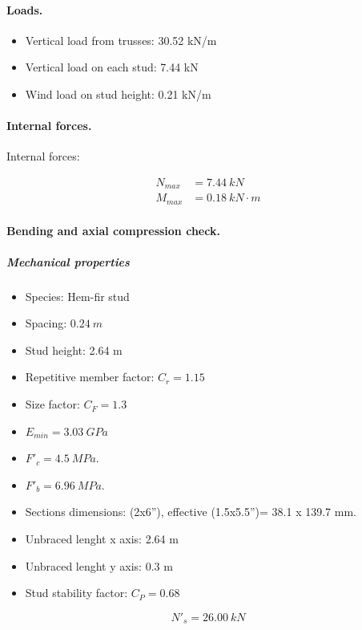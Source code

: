 \paragraph{Loads.}

\begin{itemize}
\item Vertical load from trusses: 30.52 kN/m
\item Vertical load on each stud: 7.44 kN
\item Wind load on stud height: 0.21 kN/m
\end{itemize}

\paragraph{Internal forces.}

\noindent Internal forces:

\begin{align}
  N_{max}&= 7.44\ kN \\
  M_{max}&= 0.18\ kN \cdot m
\end{align}

\paragraph{Bending and axial compression check.}

\subparagraph{Mechanical properties}

\begin{itemize}
\item Species: Hem-fir stud
\item Spacing: $0.24\ m$
\item Stud height: 2.64 m
\item Repetitive member factor: $C_r= 1.15$
\item Size factor: $C_F= 1.3$
\item $E_{min}= 3.03\ GPa$
\item $F'_c= 4.5\ MPa$.
\item $F'_b= 6.96\ MPa$.
\item Sections dimensions: (2x6''), effective (1.5x5.5'')= 38.1 x 139.7  mm.
\item Unbraced lenght x axis: 2.64 m
\item Unbraced lenght y axis: 0.3 m
\item Stud stability factor: $C_P= 0.68$
\end{itemize}

\begin{equation}
  N'_s= 26.00\ kN
\end{equation}

